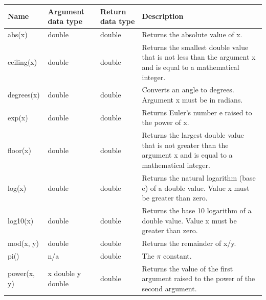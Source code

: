 \documentclass[11pt,a4paper]{ivoa}
\begin{document}
\begin{table}[thm]\footnotesize
    \begin{tabular}{|p{}|p{}|p{}|p{}|}
        \hline

        \hline
        \textbf{Name} &
        \textbf{Argument \newline data type} &
        \textbf{Return \newline data type} &
        \textbf{Description}
        \tabularnewline

        \hline
        abs(x) &
        double&double &
        Returns the absolute value of x.
        \tabularnewline

        \hline
        ceiling(x) &
        double&double &
        Returns the smallest double value that is not less than the argument x and is equal to a mathematical integer.
        \tabularnewline

        \hline
        degrees(x) &
        double &
        double &
        Converts an angle to degrees. Argument x must be in radians.
        \tabularnewline

        \hline
        exp(x) &
        double &
        double &
        Returns Euler’s number e raised to the power of x.
        \tabularnewline

        \hline
        floor(x) &
        double &
        double &
        Returns the largest double value that is not greater than the argument x and is equal to a mathematical integer.
        \tabularnewline

        \hline
        log(x) &
        double &
        double &
        Returns the natural logarithm (base e) of a double value. Value x must be greater than zero.
        \tabularnewline

        \hline
        log10(x) &
        double &
        double &
        Returns the base 10 logarithm of a double value. Value x must be greater than zero.
        \tabularnewline

        \hline
        mod(x, y) &
        double &
        double &
        Returns the remainder of x/y.
        \tabularnewline
        
        \hline
        pi() &
        n/a &
        double &
        The \(\pi\) constant.
        \tabularnewline
        
        \hline
        power(x, y) &
        x double \newline y double &
        double &
        Returns the value of the first argument raised to the power of the second argument.
        \tabularnewline


\end{tabular}
\end{table}
\end{document}
